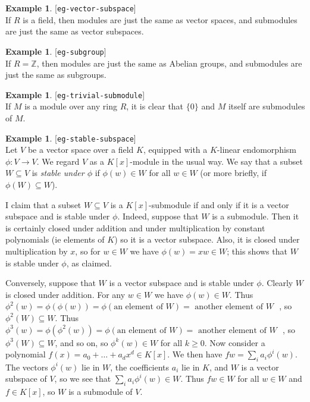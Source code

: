 \documentclass{amsart}
\newcommand{\lbl}[1]{\label{#1}\textup{[\texttt{#1}]}\ \\}
\newcommand{\lbl}{\label}
\newcommand{\Z}         {{\mathbb{Z}}}
\newcommand{\sse}       {\subseteq}
\newcommand{\xra}       {\xrightarrow}
\renewcommand{\:}{\colon}
\theoremstyle{definition}
\newtheorem{example}[theorem]{Example}
\begin{document}
\begin{example}\lbl{eg-vector-subspace}
 If $R$ is a field, then modules are just the same as vector spaces,
 and submodules are just the same as vector subspaces.
\end{example}
\begin{example}\lbl{eg-subgroup}
 If $R=\Z$, then modules are just the same as Abelian groups, and
 submodules are just the same as subgroups.
\end{example}
\begin{example}\lbl{eg-trivial-submodule}
 If $M$ is a module over any ring $R$, it is clear that $\{0\}$ and
 $M$ itself are submodules of $M$.
\end{example}
\begin{example}\lbl{eg-stable-subspace}
 Let $V$ be a vector space over a field $K$, equipped with a
 $K$-linear endomorphism $\phi\:V\xra{}V$.  We regard $V$ as a
 $K[x]$-module in the usual way.  We say that a subset $W\sse V$ is
 \emph{stable under $\phi$} if $\phi(w)\in W$ for all $w\in W$ (or
 more briefly, if $\phi(W)\sse W$).  

 I claim that a subset $W\sse V$ is a $K[x]$-submodule if and only if
 it is a vector subspace and is stable under $\phi$.  Indeed, suppose
 that $W$ is a submodule.  Then it is certainly closed under addition
 and under multiplication by constant polynomials (ie elements of $K$)
 so it is a vector subspace.  Also, it is closed under multiplication
 by $x$, so for $w\in W$ we have $\phi(w)=xw\in W$; this shows that
 $W$ is stable under $\phi$, as claimed.

 Conversely, suppose that $W$ is a vector subspace and is stable under
 $\phi$.  Clearly $W$ is closed under addition.  For any $w\in W$ we
 have $\phi(w)\in W$.  Thus $\phi^2(w)=\phi(\phi(w))=\phi(\text{an
   element of $W$})= \text{ another element of $W$ }$, so
 $\phi^2(W)\sse W$.  Thus $\phi^3(w)=\phi(\phi^2(w))=\phi(\text{an
   element of $W$})= \text{ another element of $W$ }$, so
 $\phi^3(W)\sse W$, and so on, so $\phi^k(w)\in W$ for all $k\geq 0$.
 Now consider a polynomial $f(x)=a_0+\ldots+a_dx^d\in K[x]$.  We then
 have $fw=\sum_ia_i\phi^i(w)$.  The vectors $\phi^i(w)$ lie in $W$,
 the coefficients $a_i$ lie in $K$, and $W$ is a vector subspace of
 $V$, so we see that $\sum_ia_i\phi^i(w)\in W$.  Thus $fw\in W$ for
 all $w\in W$ and $f\in K[x]$, so $W$ is a submodule of $V$.
\end{example}
\end{document}
